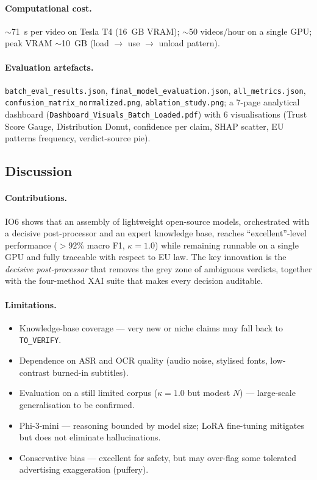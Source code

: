 \documentclass[11pt,a4paper]{article}
\newcommand{\verdict}[1]{\texttt{#1}}
\begin{document}
\paragraph{Computational cost.}
$\sim$71~s per video on Tesla T4 (16~GB VRAM); $\sim$50 videos/hour on a single
GPU; peak VRAM $\sim$10~GB (load $\to$ use $\to$ unload pattern).

\paragraph{Evaluation artefacts.}
\texttt{batch\_eval\_results.json}, \texttt{final\_model\_evaluation.json},
\texttt{all\_metrics.json}, \texttt{confusion\_matrix\_normalized.png},
\texttt{ablation\_study.png}; a 7-page analytical dashboard
(\texttt{Dashboard\_Visuals\_Batch\_Loaded.pdf}) with 6 visualisations
(Trust Score Gauge, Distribution Donut, confidence per claim, SHAP scatter,
EU patterns frequency, verdict-source pie).

\subsection{Discussion}

\paragraph{Contributions.}
IO6 shows that an assembly of lightweight open-source models, orchestrated with a
decisive post-processor and an expert knowledge base, reaches ``excellent''-level
performance ($>92\%$ macro F1, $\kappa = 1.0$) while remaining runnable on a
single GPU and fully traceable with respect to EU law. The key innovation is the
\emph{decisive post-processor} that removes the grey zone of ambiguous verdicts,
together with the four-method XAI suite that makes every decision auditable.

\paragraph{Limitations.}
\begin{itemize}[noitemsep]
  \item Knowledge-base coverage --- very new or niche claims may fall back to
  \verdict{TO\_VERIFY}.
  \item Dependence on ASR and OCR quality (audio noise, stylised fonts,
  low-contrast burned-in subtitles).
  \item Evaluation on a still limited corpus ($\kappa = 1.0$ but modest $N$) ---
  large-scale generalisation to be confirmed.
  \item Phi-3-mini --- reasoning bounded by model size; LoRA fine-tuning mitigates
  but does not eliminate hallucinations.
  \item Conservative bias --- excellent for safety, but may over-flag some
  tolerated advertising exaggeration (puffery).
\end{itemize}
\end{document}
